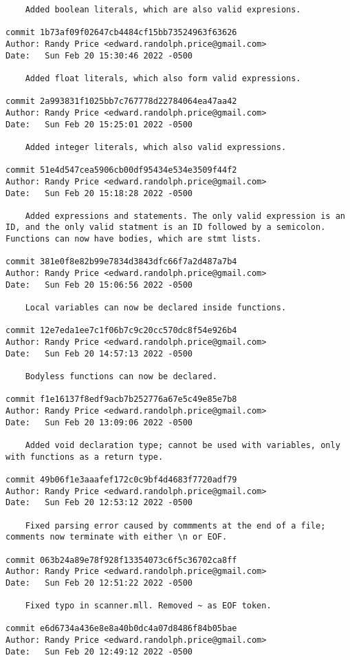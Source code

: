 {\begin{verbatim}
    Added boolean literals, which are also valid expresions.

commit 1b73af09f02647cb4484cf15bb73524963f63626
Author: Randy Price <edward.randolph.price@gmail.com>
Date:   Sun Feb 20 15:30:46 2022 -0500

    Added float literals, which also form valid expressions.

commit 2a993831f1025bb7c767778d22784064ea47aa42
Author: Randy Price <edward.randolph.price@gmail.com>
Date:   Sun Feb 20 15:25:01 2022 -0500

    Added integer literals, which also valid expressions.

commit 51e4d547cea5906cb00df95434e534e3509f44f2
Author: Randy Price <edward.randolph.price@gmail.com>
Date:   Sun Feb 20 15:18:28 2022 -0500

    Added expressions and statements. The only valid expression is an ID, and the only valid statment is an ID followed by a semicolon. Functions can now have bodies, which are stmt lists.

commit 381e0f8e82b99e7834d3843dfc66f7a2d487a7b4
Author: Randy Price <edward.randolph.price@gmail.com>
Date:   Sun Feb 20 15:06:56 2022 -0500

    Local variables can now be declared inside functions.

commit 12e7eda1ee7c1f06b7c9c20cc570dc8f54e926b4
Author: Randy Price <edward.randolph.price@gmail.com>
Date:   Sun Feb 20 14:57:13 2022 -0500

    Bodyless functions can now be declared.

commit f1e16137f8edf9acb7b252776a67e5c49e85e7b8
Author: Randy Price <edward.randolph.price@gmail.com>
Date:   Sun Feb 20 13:09:06 2022 -0500

    Added void declaration type; cannot be used with variables, only with functions as a return type.

commit 49b06f1e3aaafef172c0c9bf4d4683f7720adf79
Author: Randy Price <edward.randolph.price@gmail.com>
Date:   Sun Feb 20 12:53:12 2022 -0500

    Fixed parsing error caused by commments at the end of a file; comments now terminate with either \n or EOF.

commit 063b24a89e78f928f13354073c6f5c36702ca8ff
Author: Randy Price <edward.randolph.price@gmail.com>
Date:   Sun Feb 20 12:51:22 2022 -0500

    Fixed typo in scanner.mll. Removed ~ as EOF token.

commit e6d6734a436e8e8a40b0dc4a07d8486f84b05bae
Author: Randy Price <edward.randolph.price@gmail.com>
Date:   Sun Feb 20 12:49:12 2022 -0500


\end{verbatim}}

